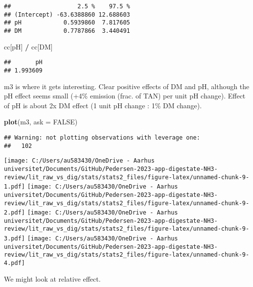 \documentclass[
]{article}
\newenvironment{Shaded}{\begin{snugshade}}{\end{snugshade}}
\newcommand{\AttributeTok}[1]{\textcolor[rgb]{0.13,0.29,0.53}{#1}}
\newcommand{\ConstantTok}[1]{\textcolor[rgb]{0.56,0.35,0.01}{#1}}
\newcommand{\FunctionTok}[1]{\textcolor[rgb]{0.13,0.29,0.53}{\textbf{#1}}}
\newcommand{\NormalTok}[1]{#1}
\newcommand{\SpecialCharTok}[1]{\textcolor[rgb]{0.81,0.36,0.00}{\textbf{#1}}}
\newcommand{\StringTok}[1]{\textcolor[rgb]{0.31,0.60,0.02}{#1}}
\begin{document}
\begin{verbatim}
##                   2.5 %    97.5 %
## (Intercept) -63.6388860 12.688603
## pH            0.5939860  7.817605
## DM            0.7787866  3.440491
\end{verbatim}

\begin{Shaded}
\begin{Highlighting}[]
\NormalTok{cc[}\StringTok{\textquotesingle{}pH\textquotesingle{}}\NormalTok{] }\SpecialCharTok{/}\NormalTok{ cc[}\StringTok{\textquotesingle{}DM\textquotesingle{}}\NormalTok{]}
\end{Highlighting}
\end{Shaded}

\begin{verbatim}
##       pH 
## 1.993609
\end{verbatim}

m3 is where it gets interesting. Clear positive effects of DM and pH,
although the pH effect seems small (+4\% emission (frac. of TAN) per
unit pH change). Effect of pH is about 2x DM effect (1 unit pH change :
1\% DM change).

\begin{Shaded}
\begin{Highlighting}[]
\FunctionTok{plot}\NormalTok{(m3, }\AttributeTok{ask =} \ConstantTok{FALSE}\NormalTok{)}
\end{Highlighting}
\end{Shaded}

\begin{verbatim}
## Warning: not plotting observations with leverage one:
##   102
\end{verbatim}

\texttt{[image: C:/Users/au583430/OneDrive - Aarhus universitet/Documents/GitHub/Pedersen-2023-app-digestate-NH3-review/lit\_raw\_vs\_dig/stats/stats2\_files/figure-latex/unnamed-chunk-9-1.pdf]}
\texttt{[image: C:/Users/au583430/OneDrive - Aarhus universitet/Documents/GitHub/Pedersen-2023-app-digestate-NH3-review/lit\_raw\_vs\_dig/stats/stats2\_files/figure-latex/unnamed-chunk-9-2.pdf]}
\texttt{[image: C:/Users/au583430/OneDrive - Aarhus universitet/Documents/GitHub/Pedersen-2023-app-digestate-NH3-review/lit\_raw\_vs\_dig/stats/stats2\_files/figure-latex/unnamed-chunk-9-3.pdf]}
\texttt{[image: C:/Users/au583430/OneDrive - Aarhus universitet/Documents/GitHub/Pedersen-2023-app-digestate-NH3-review/lit\_raw\_vs\_dig/stats/stats2\_files/figure-latex/unnamed-chunk-9-4.pdf]}

We might look at relative effect.
\end{document}
